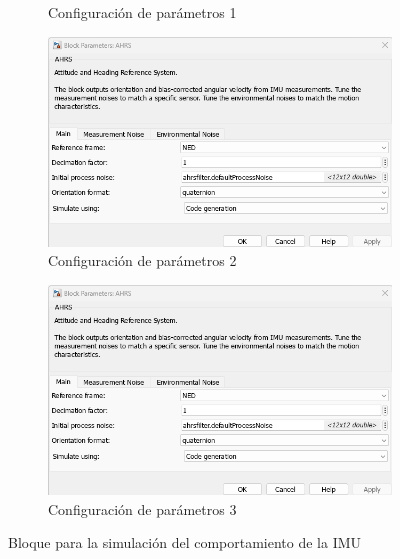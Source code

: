 \begin{figure}[htbp]
\begin{subfigure}[b]{0.45\textwidth}
        \caption{Configuración de parámetros 1}
        \label{fig:parametros_AHRS_01}
    \end{subfigure}
    \hfill
    \begin{subfigure}[b]{0.45\textwidth}
        \centering
        \includegraphics[width=\textwidth]{fig/Capitulo5/Caso_de_estudio_IMU/Generador_de_salidas/configuracion_AHRS_01.png}
        \caption{Configuración de parámetros 2}
        \label{fig:parametros_AHRS_02}
    \end{subfigure}
    \hfill
    \begin{subfigure}[b]{0.45\textwidth}
        \centering
        \includegraphics[width=\textwidth]{fig/Capitulo5/Caso_de_estudio_IMU/Generador_de_salidas/configuracion_AHRS_01.png}
        \caption{Configuración de parámetros 3}
        \label{fig:parametros_AHRS_03}
    \end{subfigure}

    \caption{Bloque para la simulación del comportamiento de la IMU}
    \label{fig:arreglo_AHRS}
\end{figure}


